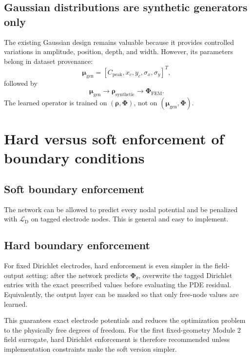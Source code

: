 \documentclass[11pt]{article}
\newcommand{\Ldir}{\mathcal{L}_{\mathrm{D}}}
\begin{document}
\subsection{Gaussian distributions are synthetic generators only}

The existing Gaussian design remains valuable because it provides controlled variations in amplitude, position, depth, and width. However, its parameters belong in dataset provenance:
\begin{equation}
\bm{\mu}_{\mathrm{gen}}=
[C_{\mathrm{peak}},x_c,y_c,\sigma_x,\sigma_y]^T,
\end{equation}
followed by
\begin{equation}
\bm{\mu}_{\mathrm{gen}}
\longrightarrow
\bm{\rho}_{\mathrm{synthetic}}
\longrightarrow
\bm{\Phi}_{\mathrm{FEM}}.
\end{equation}
The learned operator is trained on $(\bm{\rho},\bm{\Phi})$, not on $(\bm{\mu}_{\mathrm{gen}},\bm{\Phi})$.

\section{Hard versus soft enforcement of boundary conditions}

\subsection{Soft boundary enforcement}

The network can be allowed to predict every nodal potential and be penalized with $\Ldir$ on tagged electrode nodes. This is general and easy to implement.

\subsection{Hard boundary enforcement}

For fixed Dirichlet electrodes, hard enforcement is even simpler in the field-output setting: after the network predicts $\bm{\Phi}_{\theta}$, overwrite the tagged Dirichlet entries with the exact prescribed values before evaluating the PDE residual. Equivalently, the output layer can be masked so that only free-node values are learned.

This guarantees exact electrode potentials and reduces the optimization problem to the physically free degrees of freedom. For the first fixed-geometry Module 2 field surrogate, hard Dirichlet enforcement is therefore recommended unless implementation constraints make the soft version simpler.
\end{document}
